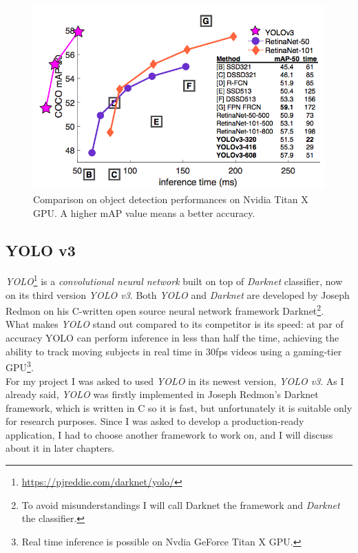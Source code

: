 \begin{figure}[htbp]
\begin{center}
\includegraphics[width=\textwidth]{immagini/pictures/netcomparison.png} 
\caption{Comparison on object detection performances on Nvidia Titan X GPU. A higher mAP value means a better accuracy.}
\end{center}
\end{figure}

\subsection{YOLO v3}
	\emph{YOLO}\footnote{\url{https://pjreddie.com/darknet/yolo/}} is a \emph{convolutional neural network} built on top of \emph{Darknet} classifier, now on its third version \emph{YOLO v3}. Both \emph{YOLO} and \emph{Darknet} are developed by Joseph Redmon on his C-written open source neural network framework Darknet\footnote{To avoid misunderstandings I will call Darknet the framework and \emph{Darknet} the classifier.}. \\
	What makes \emph{YOLO} stand out compared to its competitor is its speed: at par of accuracy YOLO can perform inference in less than half the time, achieving the ability to track moving subjects in real time in 30fps videos using a gaming-tier GPU\footnote{Real time inference is possible on Nvdia GeForce Titan X GPU.}. \\
	For my project I was asked to used \emph{YOLO} in its newest version, \emph{YOLO v3}. As I already said, \emph{YOLO} was firstly implemented in Joseph Redmon's Darknet framework, which is written in C so it is fast, but unfortunately it is suitable only for research purposes. Since I was asked to develop a production-ready application, I had to choose another framework to work on, and I will discuss about it in later chapters.
	
